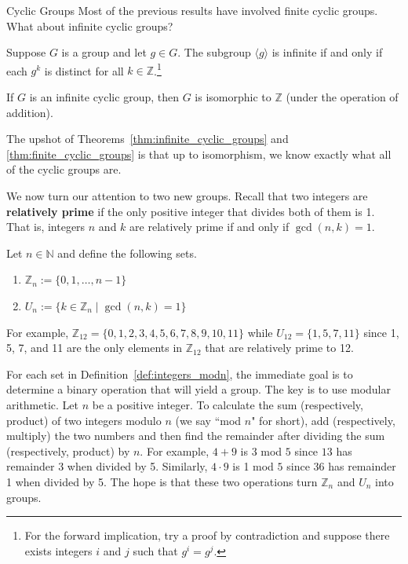 \begin{section}{Cyclic Groups}
Most of the previous results have involved finite cyclic groups.  What about infinite cyclic groups?

\begin{theorem}
Suppose $G$ is a group and let $g\in G$. The subgroup $\langle g\rangle$ is infinite if and only if each $g^k$ is distinct for all $k\in\mathbb{Z}$.\footnote{For the forward implication, try a proof by contradiction and suppose there exists integers $i$ and $j$ such that $g^i=g^j$.}
\end{theorem}

\begin{theorem}\label{thm:infinite_cyclic_groups}
If $G$ is an infinite cyclic group, then $G$ is isomorphic to $\mathbb{Z}$ (under the operation of addition).
\end{theorem}

The upshot of Theorems~\ref{thm:infinite_cyclic_groups} and \ref{thm:finite_cyclic_groups} is that up to isomorphism, we know exactly what all of the cyclic groups are.

We now turn our attention to two new groups. Recall that two integers are \textbf{relatively prime} if the only positive integer that divides both of them is 1.  That is, integers $n$ and $k$ are relatively prime if and only if $\gcd(n,k)=1$.

\begin{definition}\label{def:integers_modn}
Let $n\in\mathbb{N}$ and define the following sets.
\begin{enumerate}[label=\rm{(\alph*)}]
\item $\mathbb{Z}_n:=\{0,1,\ldots,n-1\}$
\item $U_n:=\{k\in\mathbb{Z}_n\mid \gcd(n,k)=1\}$
\end{enumerate}
\end{definition}

\begin{example}
For example, $\mathbb{Z}_{12}=\{0,1,2,3,4,5,6,7,8,9,10,11\}$ while $U_{12}=\{1,5,7,11\}$ since 1, 5, 7, and 11 are the only elements in $\mathbb{Z}_{12}$ that are relatively prime to 12.
\end{example}

For each set in Definition~\ref{def:integers_modn}, the immediate goal is to determine a binary operation that will yield a group.  The key is to use modular arithmetic.  Let $n$ be a positive integer. To calculate the sum (respectively, product) of two integers modulo $n$ (we say ``mod $n$" for short), add (respectively, multiply) the two numbers and then find the remainder after dividing the sum (respectively, product) by $n$. For example, $4+9$ is $3$ mod $5$ since $13$ has remainder 3 when divided by 5.  Similarly, $4\cdot 9$ is 1 mod $5$ since 36 has remainder 1 when divided by 5. The hope is that these two operations turn $\mathbb{Z}_n$ and $U_n$ into groups.


\end{section}
